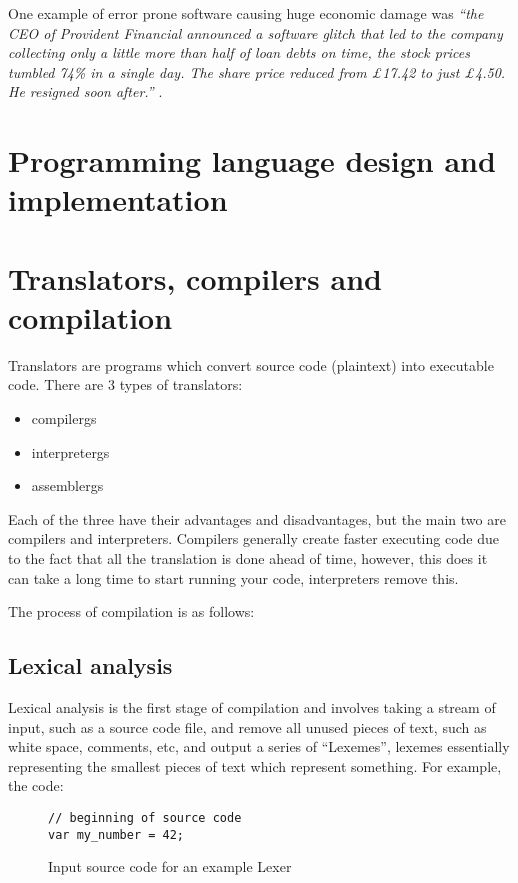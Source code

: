 \documentclass{article}
\begin{document}
One example of error prone software causing huge economic damage was \emph{``the CEO of Provident Financial announced a software glitch that led to the company collecting only a little more than half of loan debts on time, the stock prices tumbled 74\% in a single day. The share price reduced from £17.42 to just £4.50. He resigned soon after.''} \parencite{cost_of_bugs}.
\section{Programming language design and implementation}
\section{Translators, compilers and compilation}
Translators are programs which convert source code (plaintext) into executable code.
There are 3 types of translators:
\begin{itemize}
	\item \Glspl{compilerg}
	\item \Glspl{interpreterg}
	\item \Glspl{assemblerg}
\end{itemize}

Each of the three have their advantages and disadvantages, but the main two are compilers and interpreters. Compilers generally create faster executing code due to the fact that all the translation is done ahead of time, however, this does it can take a long time to start running your code, interpreters remove this.

The process of compilation is as follows:
\subsection{Lexical analysis}
Lexical analysis is the first stage of compilation and involves taking a stream of input, such as a source code file, and remove all unused pieces of text, such as white space, comments, etc, and output a series of ``Lexemes'', lexemes essentially representing the smallest pieces of text which represent something. For example, the code:

\begin{figure}[H]
	\begin{lstlisting}
// beginning of source code
var my_number = 42;
 	\end{lstlisting}
	\caption{Input source code for an example Lexer}
	\label{fig:code:pre-lexer}
\end{figure}
\end{document}
